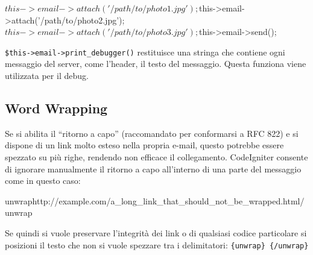 \begin{code}
$this->email->attach('/path/to/photo1.jpg');
$this->email->attach('/path/to/photo2.jpg');
$this->email->attach('/path/to/photo3.jpg');

$this->email->send();
\end{code}

\verb|$this->email->print_debugger()| restituisce una stringa che contiene ogni messaggio del server, come l'header, il testo del messaggio. Questa funziona viene utilizzata per il debug.

\subsection*{Word Wrapping}
Se si abilita il ``ritorno a capo'' (raccomandato per conformarsi a RFC 822) e si dispone di un link molto esteso nella propria e-mail, questo potrebbe essere spezzato su più righe, rendendo non efficace il collegamento. CodeIgniter consente di ignorare manualmente il ritorno a capo all'interno di una parte del messaggio come in questo caso:

\begin{code}
{unwrap}http://example.com/a_long_link_that_should_not_be_wrapped.html{/unwrap}
\end{code}

Se quindi si vuole preservare l'integrità dei link o di qualsiasi codice particolare si posizioni il testo che non si vuole spezzare tra i delimitatori: \verb|{unwrap} {/unwrap}|